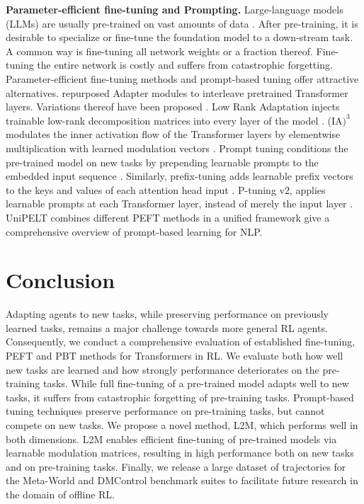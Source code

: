 \documentclass{article}
\begin{document}
\textbf{Parameter-efficient fine-tuning and Prompting.} Large-language models (LLMs) are usually pre-trained on vast amounts of data \cite{Devlin:18,Radford:19,Brown:20}. 
After pre-training, it is desirable to specialize or fine-tune the foundation model \citep{Bommasani:21} to a down-stream task. 
A common way is fine-tuning all network weights or a fraction thereof. 
Fine-tuning the entire network is costly and suffers from catastrophic forgetting.
Parameter-efficient fine-tuning methods and prompt-based tuning offer attractive alternatives. 
\citet{Houlsby:19} repurposed Adapter modules \citep{Rebuffi:17} to interleave pretrained Transformer layers. 
Variations thereof have been proposed \citep{Bapna:19,Pfeiffer:20,Pfeiffer:20a,Karimi:21}. 
Low Rank Adaptation injects trainable low-rank decomposition matrices into every layer of the model \citep{Hu:21}.
(IA$\text{)}^3$ modulates the inner activation flow of the Transformer layers by elementwise multiplication with learned modulation vectors \citep{Liu:22}.
Prompt tuning conditions the pre-trained model on new tasks by prepending learnable prompts to the embedded input sequence \citep{Lester:21}. 
Similarly, prefix-tuning adds learnable prefix vectors to the keys and values of each attention head input \cite{Xiang:21}.
P-tuning v2, applies learnable prompts at each Transformer layer, instead of merely the input layer \citep{Liu:21a}.
UniPELT combines different PEFT methods in a unified framework \citep{Mao:22}
\citet{Liu:21} give a comprehensive overview of prompt-based learning for NLP.

\section{Conclusion}\label{sec:conclusion}
Adapting agents to new tasks, while preserving performance on previously learned tasks, remains a major challenge towards more general RL agents.
Consequently, we conduct a comprehensive evaluation of established fine-tuning, PEFT and PBT methods for Transformers in RL. 
We evaluate both how well new tasks are learned and how strongly performance deteriorates on the pre-training tasks.
While full fine-tuning of a pre-trained model adapts well to new tasks, it suffers from catastrophic forgetting of pre-training tasks. 
Prompt-based tuning techniques preserve performance on pre-training tasks, but cannot compete on new tasks.
We propose a novel method, L2M, which performs well in both dimensions. 
L2M enables efficient fine-tuning of pre-trained models via learnable modulation matrices, resulting in high performance both on new tasks and on pre-training tasks.
Finally, we release a large dataset of trajectories for the Meta-World and DMControl benchmark suites to facilitate future research in the domain of offline RL.
\end{document}

